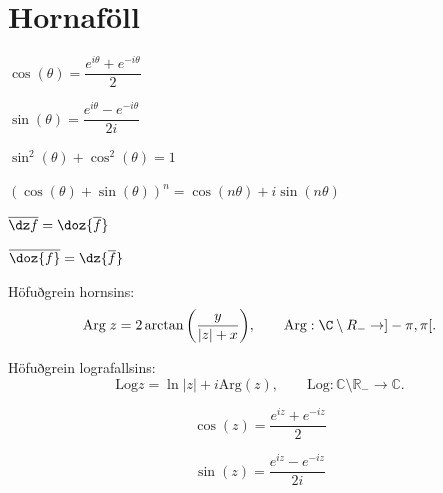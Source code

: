 \noindent
\section*{Hornaföll}

\begin{minipage}{.5\linewidth}
  $\cos(\theta) = \dfrac{e^{i \theta}+e^{-i\theta}}{2}$
\end{minipage}%
\begin{minipage}{.5\linewidth}
	$\sin(\theta) = \dfrac{e^{i \theta}-e^{-i\theta}}{2i}$
\end{minipage}

\begin{minipage}{.5\linewidth}
  $\sin^2(\theta) + \cos^2(\theta) =1$
\end{minipage}%
\begin{minipage}{.5\linewidth}
	$(\cos(\theta)+\sin(\theta))^n = \cos(n\theta)+i\sin(n\theta)$
\end{minipage}

\begin{minipage}{.5\linewidth}
	$\overline {\dz f} = \doz{ \overline{f}}$
\end{minipage}%
\begin{minipage}{.5\linewidth}
	$\overline {\doz {f}} = \dz{\overline{f}}$
\end{minipage}

\begin{minipage}{1\linewidth}
Höfuðgrein hornsins:
\begin{equation*}
  \text{Arg} \; z = 2 \arctan \bigg(\frac{y}{|z| + x} \biggl), \qquad
		  \text{Arg}: \C \setminus R_- \to ]-\pi,\pi[.
\end{equation*}
\end{minipage}
%
\begin{minipage}{1\linewidth}
\noindent Höfuðgrein lografallsins:
\begin{equation*}
      \text{Log} z = \ln |z| + i \text{Arg}(z), \qquad \text{Log}: \mathbb{C} \setminus \mathbb{R_{-}} \to \mathbb{C}.
\end{equation*}
\end{minipage}

\begin{equation*}
		\cos(z) = \frac{e^{iz}+e^{-iz}}2
\end{equation*}

\begin{equation*}
		\sin(z) = \frac{e^{iz}-e^{-iz}}{2i}
\end{equation*}

